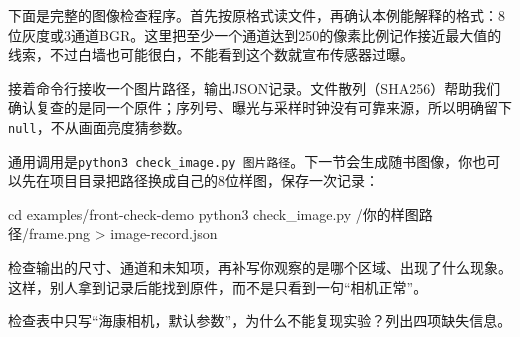 \begin{example}[先记录图片里确实有的信息]
下面是完整的图像检查程序。首先按原格式读文件，再确认本例能解释的格式：8位灰度或3通道BGR。这里把至少一个通道达到250的像素比例记作接近最大值的线索，不过白墙也可能很白，不能看到这个数就宣布传感器过曝。

\par\vspace{6pt}
\noindent\begin{minipage}[t]{\linewidth}

\end{minipage}\par\vspace{6pt}
接着命令行接收一个图片路径，输出JSON记录。文件散列（SHA256）帮助我们确认复查的是同一个原件；序列号、曝光与采样时钟没有可靠来源，所以明确留下\texttt{null}，不从画面亮度猜参数。

\par\vspace{6pt}
\noindent\begin{minipage}[t]{\linewidth}

\end{minipage}\par\vspace{6pt}
通用调用是\texttt{python3 check\_image.py 图片路径}。下一节会生成随书图像，你也可以先在项目目录把路径换成自己的8位样图，保存一次记录：
\par\vspace{6pt}
\noindent\begin{minipage}[t]{\linewidth}
\begin{tbash}
cd examples/front-check-demo
python3 check_image.py /你的样图路径/frame.png > image-record.json
\end{tbash}
\end{minipage}\par\vspace{6pt}
检查输出的尺寸、通道和未知项，再补写你观察的是哪个区域、出现了什么现象。这样，别人拿到记录后能找到原件，而不是只看到一句“相机正常”。
\end{example}

\begin{exercise}
\label{v3-ex-camera-1}
检查表中只写“海康相机，默认参数”，为什么不能复现实验？列出四项缺失信息。
\end{exercise}

